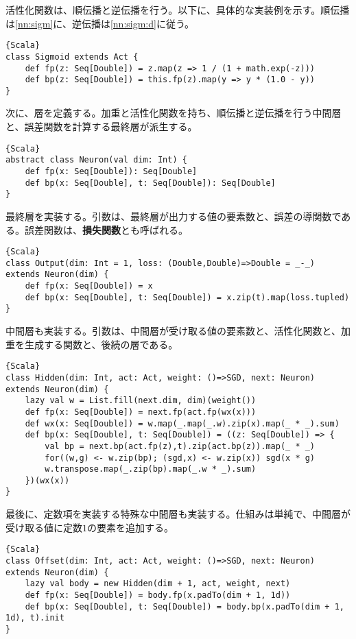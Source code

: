 \documentclass[10pt,a4paper]{book}
\begin{document}
活性化関数は、順伝播と逆伝播を行う。以下に、具体的な実装例を示す。順伝播は\eqref{nn:sigm}に、逆伝播は\eqref{nn:sigm:d}に従う。

\begin{Verbatim}{Scala}
class Sigmoid extends Act {
	def fp(z: Seq[Double]) = z.map(z => 1 / (1 + math.exp(-z)))
	def bp(z: Seq[Double]) = this.fp(z).map(y => y * (1.0 - y))
}
\end{Verbatim}

次に、層を定義する。加重と活性化関数を持ち、順伝播と逆伝播を行う中間層と、誤差関数を計算する最終層が派生する。

\begin{Verbatim}{Scala}
abstract class Neuron(val dim: Int) {
	def fp(x: Seq[Double]): Seq[Double]
	def bp(x: Seq[Double], t: Seq[Double]): Seq[Double]
}
\end{Verbatim}

最終層を実装する。引数は、最終層が出力する値の要素数と、誤差の導関数である。誤差関数は、\textbf{損失関数}とも呼ばれる。

\begin{Verbatim}{Scala}
class Output(dim: Int = 1, loss: (Double,Double)=>Double = _-_) extends Neuron(dim) {
	def fp(x: Seq[Double]) = x
	def bp(x: Seq[Double], t: Seq[Double]) = x.zip(t).map(loss.tupled)
}
\end{Verbatim}

中間層も実装する。引数は、中間層が受け取る値の要素数と、活性化関数と、加重を生成する関数と、後続の層である。

\begin{Verbatim}{Scala}
class Hidden(dim: Int, act: Act, weight: ()=>SGD, next: Neuron) extends Neuron(dim) {
	lazy val w = List.fill(next.dim, dim)(weight())
	def fp(x: Seq[Double]) = next.fp(act.fp(wx(x)))
	def wx(x: Seq[Double]) = w.map(_.map(_.w).zip(x).map(_ * _).sum)
	def bp(x: Seq[Double], t: Seq[Double]) = ((z: Seq[Double]) => {
		val bp = next.bp(act.fp(z),t).zip(act.bp(z)).map(_ * _)
		for((w,g) <- w.zip(bp); (sgd,x) <- w.zip(x)) sgd(x * g)
		w.transpose.map(_.zip(bp).map(_.w * _).sum)
	})(wx(x))
}
\end{Verbatim}

最後に、定数項を実装する特殊な中間層も実装する。仕組みは単純で、中間層が受け取る値に定数$1$の要素を追加する。

\begin{Verbatim}{Scala}
class Offset(dim: Int, act: Act, weight: ()=>SGD, next: Neuron) extends Neuron(dim) {
	lazy val body = new Hidden(dim + 1, act, weight, next)
	def fp(x: Seq[Double]) = body.fp(x.padTo(dim + 1, 1d))
	def bp(x: Seq[Double], t: Seq[Double]) = body.bp(x.padTo(dim + 1, 1d), t).init
}
\end{Verbatim}
\end{document}
